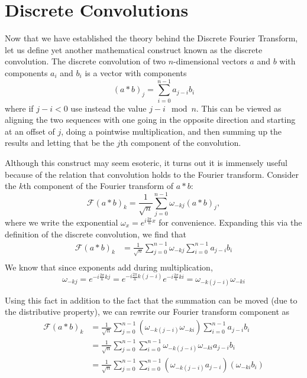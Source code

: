 \documentclass[11pt]{article}
\newcommand\del[1]{\left(#1\right)}
\newcommand\Asterisk{*}
\begin{document}
\section*{Discrete Convolutions}
Now that we have established the theory behind the Discrete Fourier Transform, let us define yet
another mathematical construct known as the discrete convolution. The discrete convolution of two
$n$-dimensional vectors $a$ and $b$ with components $a_i$ and $b_i$ is a vector with components
\[\del{a \Asterisk b}_j = \sum_{i=0}^{n-1} a_{j-i} b_i\]
where if $j - i < 0$ use instead the value $j - i \mod n$. This can be viewed as aligning the two
sequences with one going in the opposite direction and starting at an offset of $j$, doing a
pointwise multiplication, and then summing up the results and letting that be the $j$th component of
the convolution.

Although this construct may seem esoteric, it turns out it is immensely useful because of the
relation that convolution holds to the Fourier transform. Consider the $k$th component of the
Fourier transform of $a \Asterisk b$:
\[
    \mathcal{F}(a \Asterisk b)_k = \frac{1}{\sqrt{n}} \sum_{j=0}^{n-1} \omega_{-kj} (a \Asterisk b)_j,
\]
where we write the exponential $\omega_x = e^{i\frac{2\pi}{n}x}$ for convenience. Expanding this
via the definition of the discrete convolution, we find that
\begin{align*}
    \mathcal{F}(a \Asterisk b)_k &= \frac{1}{\sqrt{n}} \sum_{j=0}^{n-1} \omega_{-kj} \sum_{i=0}^{n-1} a_{j-i} b_i \\
\end{align*}
We know that since exponents add during multiplication, 
\[\omega_{-kj} = e^{-i\frac{2\pi}{n}kj} = e^{-i\frac{2\pi}{n}k(j-i)} e^{-i\frac{2\pi}{n}ki} = \omega_{-k(j-i)}\omega_{-ki}\]

Using this fact in addition to the fact that the summation can be moved (due to the distributive
property), we can rewrite our Fourier transform component as
\begin{align*}
    \mathcal{F}(a \Asterisk b)_k &= \frac{1}{\sqrt{n}} \sum_{j=0}^{n-1}  \del{\omega_{-k(j-i)}\omega_{-ki}} \sum_{i=0}^{n-1} a_{j-i} b_i \\
    &= \frac{1}{\sqrt{n}} \sum_{j=0}^{n-1}\sum_{i=0}^{n-1} \omega_{-k(j-i)}\omega_{-ki} a_{j-i} b_i \\
    &= \frac{1}{\sqrt{n}} \sum_{j=0}^{n-1}\sum_{i=0}^{n-1} \del{\omega_{-k(j-i)}a_{j-i}} \del{\omega_{-ki}  b_i}
\end{align*}
\end{document}
